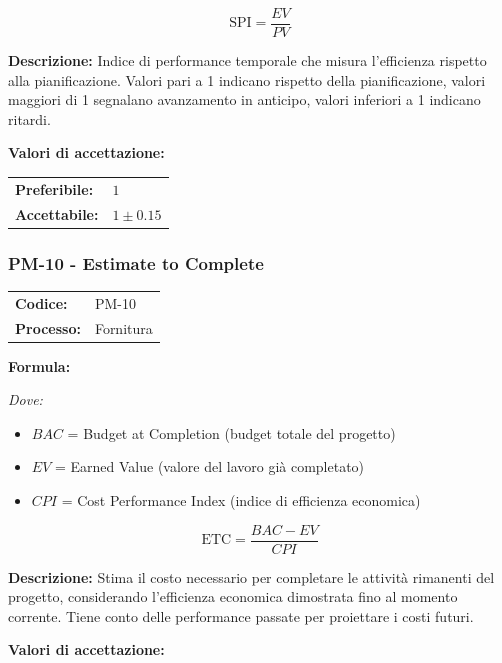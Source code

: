 \documentclass[a4paper,11pt,oneside]{scrartcl}
\begin{document}
\[
\text{SPI} = \frac{EV}{PV}
\]

\noindent\textbf{Descrizione:} Indice di performance temporale che misura l'efficienza rispetto alla pianificazione. Valori pari a 1 indicano rispetto della pianificazione, valori maggiori di 1 segnalano avanzamento in anticipo, valori inferiori a 1 indicano ritardi.

\vspace{0.2cm}
\noindent\textbf{Valori di accettazione:}
\vspace{0.1cm}

\noindent
\begin{tabular}{@{}ll@{}}
\textbf{Preferibile:} & $1$ \\
\textbf{Accettabile:} & $1 \pm 0.15$ \\
\end{tabular}

\subsubsection{PM-10 - Estimate to Complete}

\noindent
\begin{tabular}{@{}p{}p{}@{}}
\textbf{Codice:} & PM-10 \\
\textbf{Processo:} & Fornitura \\
\end{tabular}

\vspace{0.3cm}
\noindent\textbf{Formula:}

\noindent\textit{Dove:}
\begin{itemize}[leftmargin=1.5cm, topsep=0pt, itemsep=0pt]
    \item $BAC$ = Budget at Completion (budget totale del progetto)
    \item $EV$ = Earned Value (valore del lavoro già completato)
    \item $CPI$ = Cost Performance Index (indice di efficienza economica)
\end{itemize}

\[
\text{ETC} = \frac{BAC - EV}{CPI}
\]

\noindent\textbf{Descrizione:} Stima il costo necessario per completare le attività rimanenti del progetto, considerando l'efficienza economica dimostrata fino al momento corrente. Tiene conto delle performance passate per proiettare i costi futuri.

\vspace{0.2cm}
\noindent\textbf{Valori di accettazione:}
\vspace{0.1cm}
\end{document}
